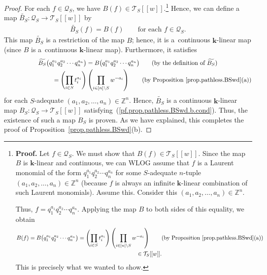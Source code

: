 \documentclass[pdftex]{sigma}
\numberwithin{equation}{section}
\let\prodnonlimits\prod
\renewcommand{\prod}{\prodnonlimits\limits}
\begin{document}
\begin{proof}
For each $f\in\mathcal{Q}_{S}$, we have $B(f) \in\mathcal{T}_{S}[[w]] $.\footnote{\textbf{Proof.} Let $f\in\mathcal{Q}_{S}$. We must show that $B(f) \in \mathcal{T}_{S}[[w]] $. Since the map $B$ is $\mathbf{k}$-linear and continuous, we can WLOG assume that $f$ is a Laurent monomial of the form $q_{1}^{a_{1}}q_{2}^{a_{2}}\cdots q_{n}^{a_{n}}$ for some $S$-adequate $n$-tuple $\left( a_{1},a_{2},\ldots,a_{n}\right) \in \mathbb{Z}^{n}$ (because $f$ is always an infinite $\mathbf{k}$-linear combination of such Laurent monomials). Assume this. Consider this $ (a_{1},a_{2},\ldots,a_{n}) \in\mathbb{Z}^{n}$.

Thus, $f=q_{1}^{a_{1}}q_{2}^{a_{2}}\cdots q_{n}^{a_{n}}$. Applying the map $B$ to both sides of this equality, we obtain
\begin{gather*}
B(f) =B\big( q_{1}^{a_{1}}q_{2}^{a_{2}}\cdots q_{n}^{a_{n}}\big) =\left( \prod_{i\in S}t_{i}^{a_{i}}\right) \left(\prod_{i\in[n] \setminus S}w^{-a_{i}}\right) \qquad ( \text{by Proposition \ref{prop.pathless.BSwd}(a)}) \\
\hphantom{B(f) =}{} \in\mathcal{T}_{S}[[w]] .
\end{gather*}
This is precisely what we wanted to show.} Hence, we can define a map $\widetilde{B_{S}}\colon \mathcal{Q}_{S}\rightarrow\mathcal{T}_{S} [ [w]] $ by
\begin{gather*}
\widetilde{B_{S}}(f) =B(f) \qquad \text{for each }f\in\mathcal{Q}_{S}.
\end{gather*}
This map $\widetilde{B_{S}}$ is a restriction of the map $B$; hence, it is a~continuous $\mathbf{k}$-linear map (since $B$ is a~continuous $\mathbf{k}$-linear map). Furthermore, it satisfies
\begin{gather*}
\widetilde{B_{S}}\big( q_{1}^{a_{1}}q_{2}^{a_{2}}\cdots q_{n}^{a_{n}}\big) =B\big( q_{1}^{a_{1}}q_{2}^{a_{2}}\cdots q_{n}^{a_{n}}\big)\qquad ( \text{by the definition of }\widetilde{B_{S}}) \\
\hphantom{\widetilde{B_{S}}\big( q_{1}^{a_{1}}q_{2}^{a_{2}}\cdots q_{n}^{a_{n}}\big)}{} =\left( \prod_{i\in S}t_{i}^{a_{i}}\right) \left( \prod_{i\in [n] \setminus S}w^{-a_{i}}\right) \qquad ( \text{by Proposition \ref{prop.pathless.BSwd}(a)})
\end{gather*}
for each $S$-adequate $ ( a_{1},a_{2},\ldots,a_{n} ) \in \mathbb{Z}^{n}$. Hence, $\widetilde{B_{S}}$ is a continuous $\mathbf{k}$-linear map $B_{S}\colon \mathcal{Q}_{S}\rightarrow\mathcal{T}_{S} [ [w]] $ satisfying~(\ref{pf.prop.pathless.BSwd.b.cond}). Thus, the existence of such a map $B_{S}$ is proven. As we have explained, this completes the proof of Proposition~\ref{prop.pathless.BSwd}(b).
\end{proof}
\end{document}
